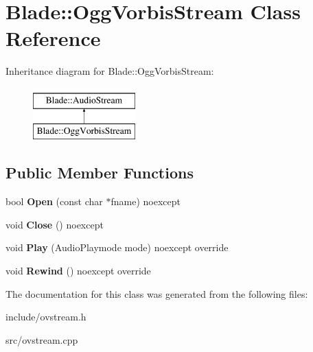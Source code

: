 \hypertarget{class_blade_1_1_ogg_vorbis_stream}{}\section{Blade\+:\+:Ogg\+Vorbis\+Stream Class Reference}
\label{class_blade_1_1_ogg_vorbis_stream}
Inheritance diagram for Blade\+:\+:Ogg\+Vorbis\+Stream\+:\begin{figure}[H]
\begin{center}
\leavevmode
\includegraphics[height=2.000000cm]{class_blade_1_1_ogg_vorbis_stream}
\end{center}
\end{figure}
\subsection*{Public Member Functions}
\begin{DoxyCompactItemize}
\item 
\mbox{\label{class_blade_1_1_ogg_vorbis_stream_ab6384abf34fc27973b4c48372b4d0428}} 
bool {\bfseries Open} (const char $\ast$fname) noexcept
\item 
\mbox{\label{class_blade_1_1_ogg_vorbis_stream_a90a0b0dc5ee100621785c4444819cdba}} 
void {\bfseries Close} () noexcept
\item 
\mbox{\label{class_blade_1_1_ogg_vorbis_stream_ac039a89c2b58d5bfd9c329b3df4e771e}} 
void {\bfseries Play} (Audio\+Playmode mode) noexcept override
\item 
\mbox{\label{class_blade_1_1_ogg_vorbis_stream_a2e70b39f525decae6f48efc7950e8db3}} 
void {\bfseries Rewind} () noexcept override
\end{DoxyCompactItemize}


The documentation for this class was generated from the following files\+:\begin{DoxyCompactItemize}
\item 
include/ovstream.\+h\item 
src/ovstream.\+cpp\end{DoxyCompactItemize}
